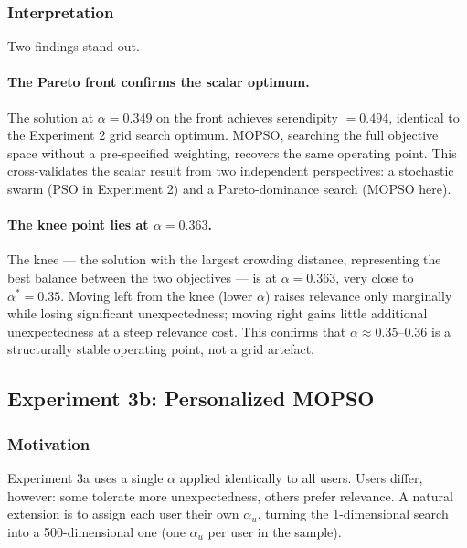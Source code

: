 \subsubsection{Interpretation}

Two findings stand out.

\paragraph{The Pareto front confirms the scalar optimum.}
The solution at $\alpha = 0.349$ on the front achieves serendipity $= 0.494$,
identical to the Experiment 2 grid search optimum.  MOPSO, searching the full
objective space without a pre-specified weighting, recovers the same operating
point.  This cross-validates the scalar result from two independent
perspectives: a stochastic swarm (PSO in Experiment 2) and a Pareto-dominance
search (MOPSO here).

\paragraph{The knee point lies at $\alpha = 0.363$.}
The knee — the solution with the largest crowding distance, representing the
best balance between the two objectives — is at $\alpha = 0.363$, very close
to $\alpha^* = 0.35$.  Moving left from the knee (lower $\alpha$) raises
relevance only marginally while losing significant unexpectedness; moving right
gains little additional unexpectedness at a steep relevance cost.  This
confirms that $\alpha \approx 0.35$--$0.36$ is a structurally stable operating
point, not a grid artefact.

\subsection{Experiment 3b: Personalized MOPSO}
\label{sec:exp3b}

\subsubsection{Motivation}

Experiment 3a uses a single $\alpha$ applied identically to all users.
Users differ, however: some tolerate more unexpectedness, others prefer
relevance.  A natural extension is to assign each user their own $\alpha_u$,
turning the 1-dimensional search into a 500-dimensional one (one $\alpha_u$
per user in the sample).

